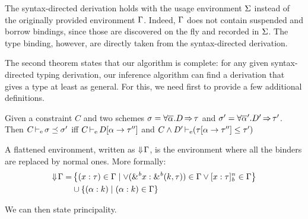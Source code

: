 The syntax-directed derivation holds with the usage environment $\Sv$ instead of the originally provided environment $\E$. Indeed,
$\E$ does not contain suspended and borrow bindings, since those
are discovered on the fly and recorded in $\Sv$. The type binding, however,
are directly taken from the syntax-directed derivation.

The second theorem states that our algorithm is complete: for any given
syntax-directed typing derivation, our inference algorithm can find
a derivation that gives a type at least as general.
For this, we need first to provide a few additional definitions.


\begin{definition}
  Given a constraint $C$ and two schemes
  $\schm = \forall \Multi\tvar. \qual{D}{\tau}$ and
  $\schm' = \forall \Multi\tvar'. \qual{D'}{\tau'} $.
  Then $\entail{C}{\schm \preceq \schm'}$
  iff $\entail{C}{\subst{\tvar}{\tau''} D}$
  and $\entail{C\Cand D'}{\Cleq{\subst{\tvar}{\tau''}\tau}{\tau'}}$
\end{definition}

\begin{definition}
A flattened environment,
written as $\Eflat\E$, is the environment
where all the binders are replaced by normal ones. More formally:
\begin{align*}
  \Eflat\E
  =& \left\{\bvar{x}{\tau}\in\E \mid
    \vee \bvar{\borrow{x}}{\borrowty{k}{\tau}}\in\E
    \vee \svar{x}{\tau}^n\in\E
    \right\}\\
  &\cup \left\{ \bvar{\tvar}{k} \mid \bvar{\tvar}{k}\in\E \right\}
\end{align*}
\end{definition}


We can then state principality.


